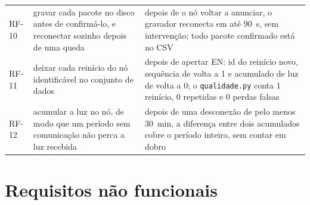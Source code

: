 \begin{table}[H]
\begin{tabular}{@{}L{1.4cm}L{6.0cm}L{6.6cm}@{}}
RF-10 & gravar cada pacote no disco antes de confirmá-lo, e reconectar
        sozinho depois de uma queda
      & depois de o nó voltar a anunciar, o gravador reconecta em até
        \SI{90}{\second}, sem intervenção; todo pacote confirmado está no
        CSV \\
RF-11 & deixar cada reinício do nó identificável no conjunto de dados
      & depois de apertar EN: id do reinício novo, sequência de volta a 1
        e acumulado de luz de volta a 0; o \texttt{qualidade.py} conta 1
        reinício, 0 repetidas e 0 perdas falsas \\
RF-12 & acumular a luz no nó, de modo que um período sem comunicação não
        perca a luz recebida
      & depois de uma desconexão de pelo menos \SI{30}{\minute}, a
        diferença entre dois acumulados cobre o período inteiro, sem
        contar em dobro \\
\bottomrule
\end{tabular}
\end{table}

\section{Requisitos não funcionais}

